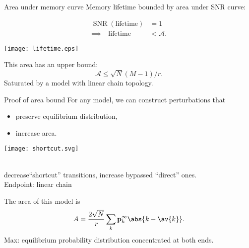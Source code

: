 \documentclass{beamer}%
\DeclareMathOperator{\SNR}{SNR}
\newcommand{\pr}{\mathbf{p}}
\newcommand{\eq}{\pr^\infty}
\newcommand{\area}{\mathcal{A}}
\begin{document}
\begin{frame}{Area under memory curve}
%
  Memory lifetime bounded by area under SNR curve:\\
  \vp\parbox{5cm}{
  \begin{equation*}
  \begin{aligned}
    \SNR(\text{lifetime})&=1
    \\
    \implies
    \quad
    \text{lifetime} &< \area.
  \end{aligned}
  \end{equation*}
  }
  \parbox{6.5cm}{
    \texttt{[image: lifetime.eps]}
  }

  \vp This area has an upper bound:
  \begin{equation*}
    \area \leq \sqrt{N}(M-1)/r.
  \end{equation*}
  Saturated by a model with linear chain topology.
%
\end{frame}


\begin{frame}[label=fr_areaproof]{Proof of area bound}
%
 For any model, we can construct perturbations that
 \parbox[c]{5cm}{
  \begin{itemize}
    \item preserve equilibrium distribution,
    \item increase area.
  \end{itemize}
  \hyperlink{fr_tech}{}
 }
 \parbox[c]{5cm}{
  \begin{center}
    \texttt{[image: shortcut.svg]}
  \end{center}
 }\\
 \eg decrease``shortcut'' transitions, increase bypassed ``direct'' ones.\\
 Endpoint: linear chain

 \vp The area of this model is
 \begin{equation*}
   A = \frac{2\sqrt{N}}{r}\sum_k \eq_k \abs{k-\av{k}}.
 \end{equation*}
 \note[item]{max given $\eq$}
 \note[item]{now max \wrt $\eq$}
 Max: equilibrium probability distribution concentrated at both ends.
 \\
%
\end{frame}
\end{document}
